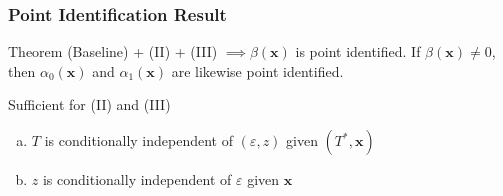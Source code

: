 \documentclass[handout]{beamer}
\begin{document}
\begin{frame}
  \frametitle{Point Identification Result}

  \small 

  \begin{alertblock}{Theorem}
    (Baseline) + (II) + (III) $\implies \beta(\mathbf{x})$ is point identified.
    If $\beta(\mathbf{x}) \neq 0$, then $\alpha_0(\mathbf{x})$ and $\alpha_1(\mathbf{x})$ are likewise point identified.
  \end{alertblock}

\vspace{1em}

%
%

  \begin{block}{Sufficient for (II) and (III)}
    \vspace{-0.5em}
    \begin{enumerate}[(a)]
      \item $T$ is conditionally independent of $(\varepsilon,z)$ given $(T^*,\mathbf{x})$
      \item $z$ is conditionally independent of $\varepsilon$ given $\mathbf{x}$
    \end{enumerate}
  \end{block}
\end{frame}

\end{document}
